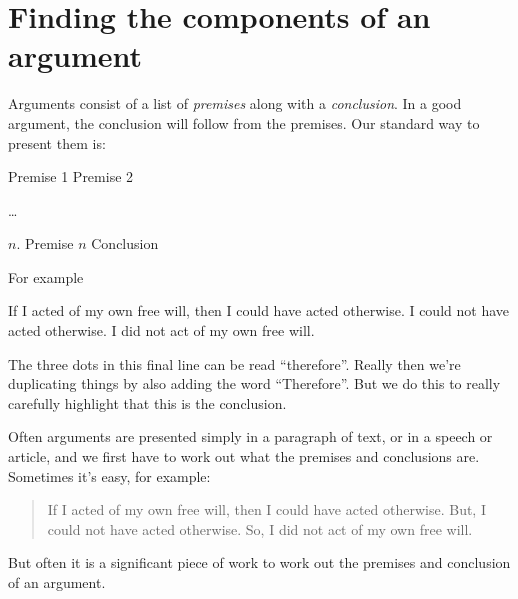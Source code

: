 




\section{Finding the components of an argument}



Arguments consist of a list of \emph{premises} along with a \emph{conclusion}. In a good argument, the conclusion will follow from the premises.
Our standard way to present them is:
\begin{earg}
\prem Premise 1
\prem Premise 2
\item[] \dots
\item[$n$.] Premise $n$
\conc Conclusion
\end{earg}
For	example
	\begin{earg}
	\prem If I acted of my own free will, then I could have acted otherwise.
	\prem I could not have acted otherwise.
	\conc I did not act of my own free will.
	\end{earg}

The three dots in this final line can be read ``therefore''. Really then we're duplicating things by also adding the word ``Therefore''. But we do this to really carefully highlight that this is the conclusion. %


Often arguments are presented simply in a paragraph of text, or in a speech or article, and we first have to work out what the premises and conclusions are.
Sometimes it's easy, for example:
\begin{quote}
	If I acted of my own free will, then I could have acted otherwise.
	But, I could not have acted otherwise.
	So, I did not act of my own free will.
\end{quote}
But often it is a significant piece of work to work out the premises and conclusion of an argument.




